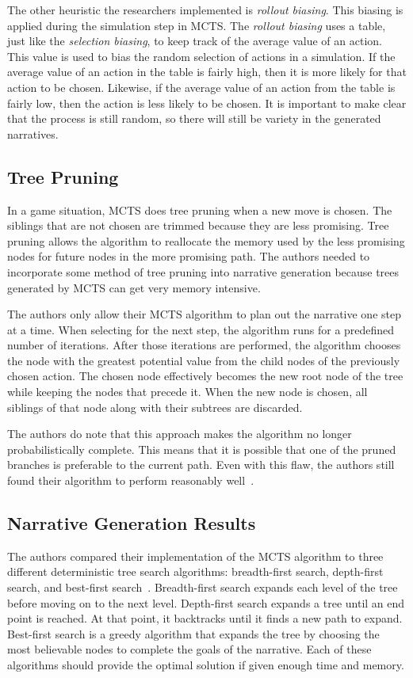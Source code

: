 \documentclass{sig-alternate}
\begin{document}
The other heuristic the researchers implemented is \textit{rollout biasing}. This biasing is applied during the simulation step in MCTS. The \textit{rollout biasing} uses a table, just like the \textit{selection biasing}, to keep track of the average value of an action. This value is used to bias the random selection of actions in a simulation. If the average value of an action in the table is fairly high, then it is more likely for that action to be chosen. Likewise, if the average value of an action from the table is fairly low, then the action is less likely to be chosen. It is important to make clear that the process is still random, so there will still be variety in the generated narratives.

\subsection{Tree Pruning}
In a game situation, MCTS does tree pruning when a new move is chosen. The siblings that are not chosen are trimmed because they are less promising. Tree pruning allows the algorithm to reallocate the memory used by the less promising nodes for future nodes in the more promising path. The authors needed to incorporate some method of tree pruning into narrative generation because trees generated by MCTS can get very memory intensive.

The authors only allow their MCTS algorithm to plan out the narrative one step at a time. When selecting for the next step, the algorithm runs for a predefined number of iterations. After those iterations are performed, the algorithm chooses the node with the greatest potential value from the child nodes of the previously chosen action. The chosen node effectively becomes the new root node of the tree while keeping the nodes that precede it. When the new node is chosen, all siblings of that node along with their subtrees are discarded.

The authors do note that this approach makes the algorithm no longer probabilistically complete. This means that it is possible that one of the pruned branches is preferable to the current path. Even with this flaw, the authors still found their algorithm to perform reasonably well~\cite{Narrative}.

\subsection{Narrative Generation Results}
The authors compared their implementation of the MCTS algorithm to three different deterministic tree search algorithms: breadth-first search, depth-first search, and best-first search~\cite{Narrative}. Breadth-first search expands each level of the tree before moving on to the next level. Depth-first search expands a tree until an end point is reached. At that point, it backtracks until it finds a new path to expand. Best-first search is a greedy algorithm that expands the tree by choosing the most believable nodes to complete the goals of the narrative. Each of these algorithms should provide the optimal solution if given enough time and memory.
\end{document}
